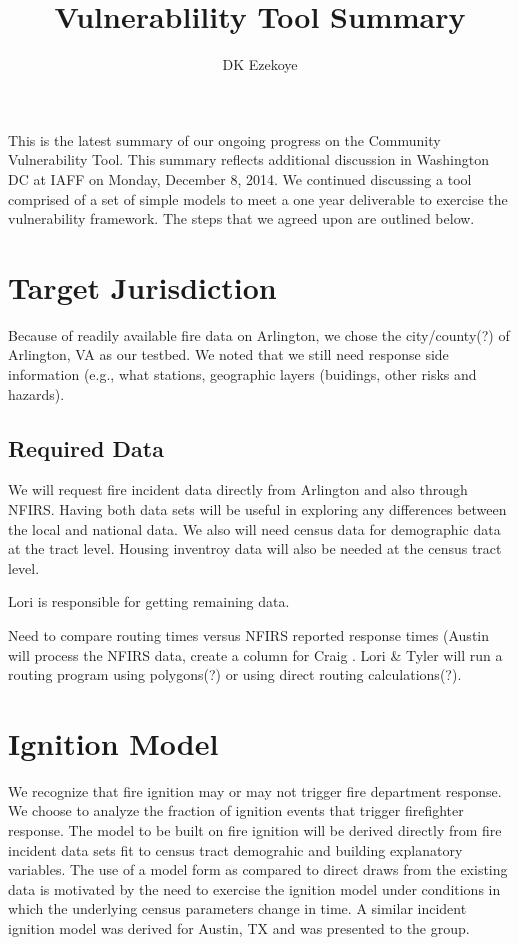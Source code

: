 \documentclass[11pt]{article} %
\title{Vulnerablility  Tool  Summary}
\author{DK Ezekoye}
\begin{document}
\maketitle

This is the latest summary of our ongoing progress on the Community Vulnerability Tool. This summary reflects additional discussion in Washington DC at IAFF on Monday, December 8, 2014.  We continued discussing a  tool comprised of a set of simple models to meet a one year deliverable to exercise the vulnerability framework. The steps that we agreed upon are outlined below.

\section{Target Jurisdiction}

Because of readily available fire data on Arlington, we chose the city/county(?)  of Arlington, VA as our testbed. 
We noted that we still need response side information (e.g., what stations, geographic layers (buidings, other risks and hazards).


\subsection{Required Data}

We will request fire incident data directly from Arlington and also through NFIRS. Having both data sets will be useful in exploring any differences between the local and national data. We also will need census data for demographic data at the tract level.  Housing inventroy data will also be needed at the census tract level.

Lori is responsible for getting remaining data.

Need to compare routing times versus NFIRS reported response times (Austin will process the NFIRS  data, create a column for Craig . Lori \& Tyler will run a routing program using polygons(?) or using direct routing calculations(?).  

\section{Ignition Model}

We recognize that fire ignition may or may not trigger fire department response. We choose to analyze the fraction of ignition events that trigger firefighter response. The model to be built on fire ignition will be derived directly from fire incident data sets fit to census tract demograhic and building explanatory variables.  The use of a model form as compared to direct draws from the existing data is motivated by the need to exercise the ignition model under conditions in which the underlying census parameters change in time.  A similar incident ignition model was derived for Austin, TX and was presented to the group.
\end{document}
